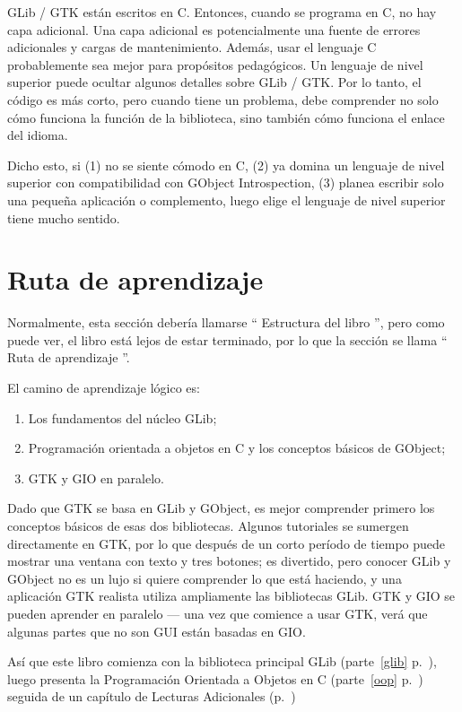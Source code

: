 GLib / GTK están escritos en C. Entonces, cuando se programa en C, no hay capa adicional. Una capa adicional es potencialmente una fuente de errores adicionales y cargas de mantenimiento. Además, usar el lenguaje C probablemente sea mejor para propósitos pedagógicos. Un lenguaje de nivel superior puede ocultar algunos detalles sobre GLib / GTK. Por lo tanto, el código es más corto, pero cuando tiene un problema, debe comprender no solo cómo funciona la función de la biblioteca, sino también cómo funciona el enlace del idioma.

Dicho esto, si (1) no se siente cómodo en C, (2) ya domina un lenguaje de nivel superior con compatibilidad con GObject Introspection, (3) planea escribir solo una pequeña aplicación o complemento, luego elige el lenguaje de nivel superior tiene mucho sentido.

\section{Ruta de aprendizaje}
\label{intro-learning-path}

Normalmente, esta sección debería llamarse `` Estructura del libro '', pero como puede ver, el libro está lejos de estar terminado, por lo que la sección se llama `` Ruta de aprendizaje ''.

El camino de aprendizaje lógico es:
\begin{enumerate}
    \item Los fundamentos del núcleo GLib;
    \item Programación orientada a objetos en C y los conceptos básicos de GObject;
    \item GTK y GIO en paralelo.
\end{enumerate}

Dado que GTK se basa en GLib y GObject, es mejor comprender primero los conceptos básicos de esas dos bibliotecas. Algunos tutoriales se sumergen directamente en GTK, por lo que después de un corto período de tiempo puede mostrar una ventana con texto y tres botones; es divertido, pero conocer GLib y GObject no es un lujo si quiere comprender lo que está haciendo, y una aplicación GTK realista utiliza ampliamente las bibliotecas GLib. GTK y GIO se pueden aprender en paralelo --- una vez que comience a usar GTK, verá que algunas partes que no son GUI están basadas en GIO.

Así que este libro comienza con la biblioteca principal GLib (parte~\ref{glib} p.~\pageref{glib}), luego presenta la Programación Orientada a Objetos en C (parte~\ref{oop} p.~\pageref{oop}) seguida de un capítulo de Lecturas Adicionales (p.~\pageref{further-reading})

